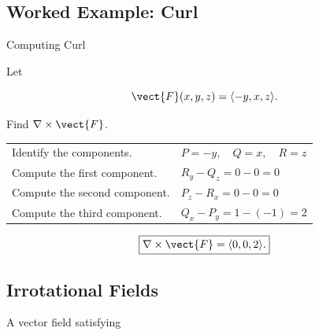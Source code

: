 \begin{center}
\end{center}

\subsection{Worked Example: Curl}
\label{subsec:worked-curl}

\begin{workedexamplebox}{Computing Curl}

Let

\[ \vect{F}(x,y,z)=\langle-y,x,z\rangle. \]

Find \(\nabla\times\vect{F}\).

\begin{tabularx}{\textwidth}{@{}>{\raggedright\arraybackslash}p{}X@{}}
Identify the components. &
\(P=-y,\quad Q=x,\quad R=z\)\\
Compute the first component. &
\(R_y-Q_z=0-0=0\)\\
Compute the second component. &
\(P_z-R_x=0-0=0\)\\
Compute the third component. &
\(Q_x-P_y=1-(-1)=2\)
\end{tabularx}

\begin{answerbox}
\[ \boxed{\nabla\times\vect{F}=\langle0,0,2\rangle.} \]
\end{answerbox}
\end{workedexamplebox}

\subsection{Irrotational Fields}
\label{subsec:irrotational-fields}

A vector field satisfying

